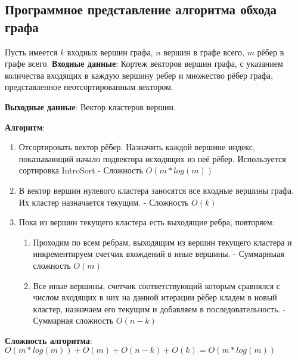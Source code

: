 \subsection{Программное представление алгоритма обхода графа}
\label{sec:softwarepresentationgraph}
Пусть имеется $k$ входных вершин графа, $n$ вершин в графе всего, $m$ рёбер в графе всего.
\textbf{Входные данные}: Кортеж векторов вершин графа, с указанием количества входящих в каждую вершину ребер и множество рёбер графа, представленное неотсортированным вектором.
\par
\textbf{Выходные данные}: Вектор кластеров вершин.
\par
\textbf{Алгоритм}: \begin{enumerate}
    \item Отсортировать вектор рёбер. Назначить каждой вершине индекс, показывающий начало подвектора исходящих из неё рёбер. Используется сортировка IntroSort - Сложность $O(m*log(m))$
    \item В вектор вершин нулевого кластера заносятся все входные вершины графа. Их кластер назначается текущим. - Сложность $O(k)$
    \item Пока из вершин текущего кластера есть выходящие ребра, повторяем:
    \begin{enumerate}
        \item Проходим по всем ребрам, выходящим из вершин текущего кластера и инкрементируем счетчик вхождений в иные вершины. - Суммарныая сложность $O(m)$
        \item Все иные вершины, счетчик соответствующий которым сравнялся с числом входящих в них на данной итерации рёбер кладем в новый кластер, назначаем его текущим и добавляем в последовательность. - Суммарная сложность $O(n-k)$
    \end{enumerate}
\end{enumerate}
\par
\textbf{Сложность алгоритма}: $O(m*log(m)) + O(m) + O(n-k) + O(k) = O(m*log(m))$
